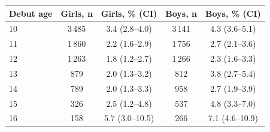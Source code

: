 \begin{tabular}{lcccc}
\toprule
Debut age & Girls, n & Girls, \% (CI) & Boys, n & Boys, \% (CI) \\
\midrule
10 & 3\,485 & 3.4 (2.8--4.0) & 3\,141 & 4.3 (3.6--5.1) \\
11 & 1\,860 & 2.2 (1.6--2.9) & 1\,756 & 2.7 (2.1--3.6) \\
12 & 1\,263 & 1.8 (1.2--2.7) & 1\,266 & 2.3 (1.6--3.3) \\
13 & 879 & 2.0 (1.3--3.2) & 812 & 3.8 (2.7--5.4) \\
14 & 789 & 2.0 (1.3--3.3) & 958 & 2.7 (1.9--3.9) \\
15 & 326 & 2.5 (1.2--4.8) & 537 & 4.8 (3.3--7.0) \\
16 & 158 & 5.7 (3.0--10.5) & 266 & 7.1 (4.6--10.9) \\
\bottomrule
\end{tabular}

